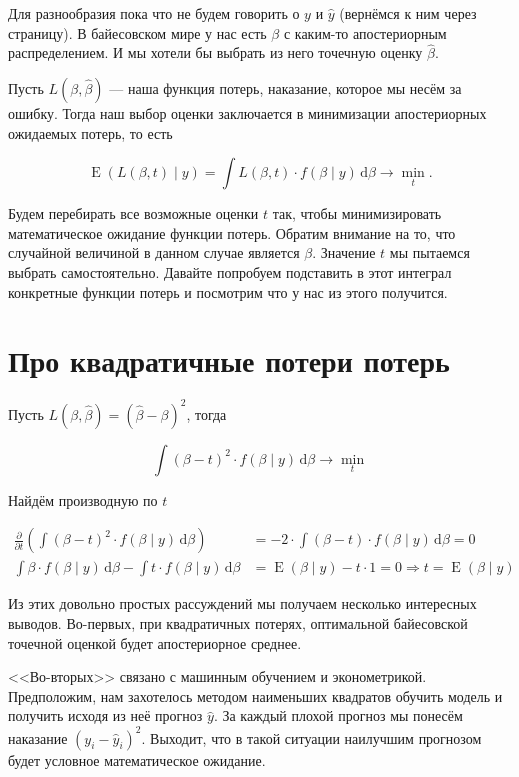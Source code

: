 \documentclass[12pt, a4paper, oneside]{extreport}
\DeclareMathOperator{\E}{\mathop{E}}
\def \b{\beta}
\newcommand{\dx}[1]{\,\mathrm{d}#1} %
\theoremstyle{plain}              %
\theoremstyle{definition}         %
\begin{document}
Для разнообразия пока что не будем говорить о $y$ и $\hat y$ (вернёмся к ним через страницу). В байесовском мире у нас есть $\beta$ с каким-то апостериорным распределением. И мы хотели бы выбрать из него точечную оценку $\hat \beta$. 

Пусть $L(\beta, \hat \beta)$ --- наша функция потерь, наказание, которое мы несём за ошибку. Тогда наш выбор оценки заключается в минимизации апостериорных ожидаемых потерь, то есть 

\[ \E( L(\beta, t) \mid y) = \int L(\beta,t) \cdot f(\beta \mid y) \dx{\b} \to \min_{t}. \]

Будем перебирать все возможные оценки $t$ так, чтобы минимизировать математическое ожидание функции потерь. Обратим внимание на то, что случайной величиной в данном случае является $\beta$. Значение $t$ мы пытаемся выбрать самостоятельно.  Давайте попробуем подставить в этот интеграл конкретные функции потерь и посмотрим что у нас из этого получится. 

\section{Про квадратичные потери потерь}

Пусть $L(\beta, \hat \beta) = (\hat \beta - \beta)^2$, тогда 

\[ \int (\beta - t)^2 \cdot f(\beta \mid y) \dx{\beta} \to \min_{t} \] 

Найдём производную по $t$

\begin{align*}
\frac{\partial }{\partial t} \left(  \int (\beta - t)^2 \cdot f(\beta \mid y) \dx{\beta}   \right) &= - 2 \cdot \int (\beta - t) \cdot f(\beta \mid y) \dx{\beta} = 0 \\ 
\int \beta \cdot f(\beta \mid y) \dx{\beta} - \int  t \cdot f(\beta \mid y) \dx{\beta} &= \E(\beta \mid y) - t \cdot 1 =  0 \Rightarrow  t = \E(\beta \mid y) 
\end{align*}

Из этих довольно простых рассуждений мы получаем несколько интересных выводов. Во-первых, при квадратичных потерях, оптимальной байесовской точечной оценкой будет апостериорное среднее. 

<<Во-вторых>> связано с машинным обучением и эконометрикой. Предположим, нам захотелось методом наименьших квадратов обучить модель и получить исходя из неё прогноз $\hat y$. За каждый плохой прогноз мы понесём наказание $(y_i - \hat y_i)^2$. Выходит, что в такой ситуации наилучшим прогнозом будет условное математическое ожидание. 
\end{document}
